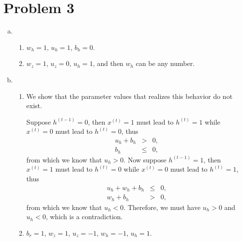 \documentclass[11pt, oneside]{article}      %
\newcommand{\hasPageBreak}{}
\begin{document}
\hasPageBreak
\section*{Problem 3}
\begin{enumerate}   [(a)]
\item 
\begin{enumerate}   [i]
\item $w_h = 1$, $u_h = 1$, $b_h = 0$.
\item $w_z = 1$, $u_z = 0$, $u_h = 1$, and then $w_h$ can be any number.
\end{enumerate}







\item
\begin{enumerate}   [i]
\item 
We show that the parameter values that realizes this  behavior do not exist. 

Suppose $h^{(t-1)} = 0$, then $x^{(t)} = 1$ must lead to $h^{(t)} = 1$ while $x^{(t)} = 0$ must lead to $h^{(t)} = 0$, thus
\begin{eqnarray*}
u_h + b_h &>& 0,
\\
b_h &\leq& 0,
\end{eqnarray*}
from which we know that $u_h > 0$. Now suppose $h^{(t-1)} = 1$, then $x^{(t)} = 1$ must lead to $h^{(t)} = 0$ while $x^{(t)} = 0$ must lead to $h^{(t)} = 1$, thus
\begin{eqnarray*}
u_h + w_h + b_h &\leq& 0,
\\
w_h + b_h &>& 0,
\end{eqnarray*}
from which we know that $u_h < 0$. Therefore, we must have $u_h > 0$ and $u_h < 0$, which is a contradiction.



\item
$b_r = 1$, $w_z = 1$, $u_z = -1$, $w_h = -1$, $u_h = 1$.
\end{enumerate}






\end{enumerate}





\end{document}
